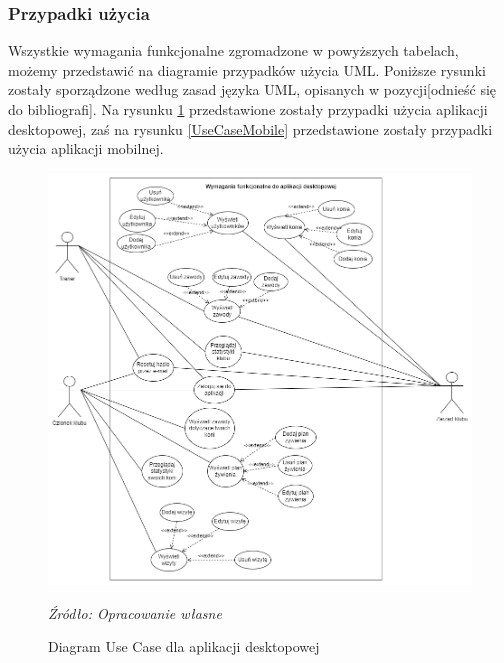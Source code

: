 \documentclass[12pt,twoside]{report}
\begin{document}
\subsubsection{Przypadki użycia}
Wszystkie wymagania funkcjonalne zgromadzone w powyższych tabelach, możemy przedstawić na diagramie przypadków użycia UML. Poniższe rysunki zostały sporządzone według zasad języka UML, opisanych w pozycji[odnieść się do bibliografi]. Na rysunku \ref{UseCaseDesktop} przedstawione zostały przypadki użycia aplikacji desktopowej, zaś na rysunku \ref{UseCaseMobile} przedstawione zostały przypadki użycia aplikacji mobilnej.
\begin{figure}[H]
	\centering
	\includegraphics[scale=0.5]{UseCaseDesktop}
	\caption{Diagram Use Case dla aplikacji desktopowej}
	\textit{Źródło: Opracowanie własne}
	\label{UseCaseDesktop}
\end{figure}
\end{document}
